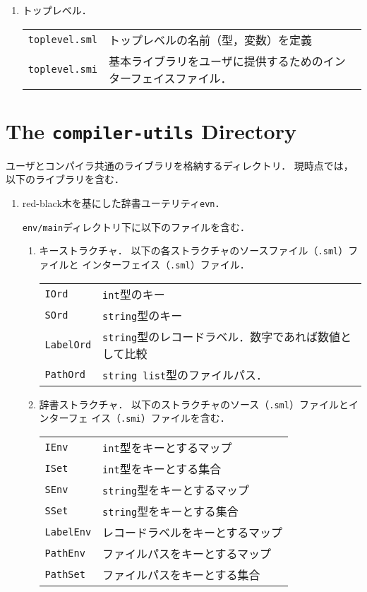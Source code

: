 \documentclass{jbook}
\newif\ifjp
\newcommand{\txt}[2]{#2}
\newcommand{\code}[1]{\mbox{\large\tt #1}}
\begin{document}
\begin{enumerate}
\item トップレベル．

\begin{tabular}{ll}
\code{toplevel.sml} & トップレベルの名前（型，変数）を定義
\\
\code{toplevel.smi} & 基本ライブラリをユーザに提供するためのインターフェイスファイル．
\end{tabular}
\end{enumerate}
\else%
\fi%

\section{\txt{\code{compiler-utils}ディレクトリ}{The \code{compiler-utils} Directory}}
\ifjp%
	ユーザとコンパイラ共通のライブラリを格納するディレクトリ．
	現時点では，以下のライブラリを含む．

\begin{enumerate}
\item red-black木を基にした辞書ユーテリティ\code{evn}．

	\code{env/main}ディレクトリ下に以下のファイルを含む．
\begin{enumerate}
\item キーストラクチャ．
	以下の各ストラクチャのソースファイル（\code{.sml}）ファイルと
インターフェイス（\code{.sml}）ファイル．
\begin{tabular}{ll}
\code{IOrd} & \code{int}型のキー\\
\code{SOrd} & \code{string}型のキー\\
\code{LabelOrd} & \code{string}型のレコードラベル．数字であれば数値として比較\\
\code{PathOrd} & \code{string list}型のファイルパス．
\end{tabular}

\item 辞書ストラクチャ．
	以下のストラクチャのソース（\code{.sml}）ファイルとインターフェ
イス（\code{.smi}）ファイルを含む．
\begin{tabular}{ll}
\code{IEnv} & \code{int}型をキーとするマップ
\\
\code{ISet} & \code{int}型をキーとする集合
\\
\code{SEnv} & \code{string}型をキーとするマップ
\\
\code{SSet} & \code{string}型をキーとする集合
\\
\code{LabelEnv} & レコードラベルをキーとするマップ
\\
\code{PathEnv} & ファイルパスをキーとするマップ
\\
\code{PathSet} & ファイルパスをキーとする集合
\end{tabular}
\end{enumerate}
\end{enumerate}
\end{document}
